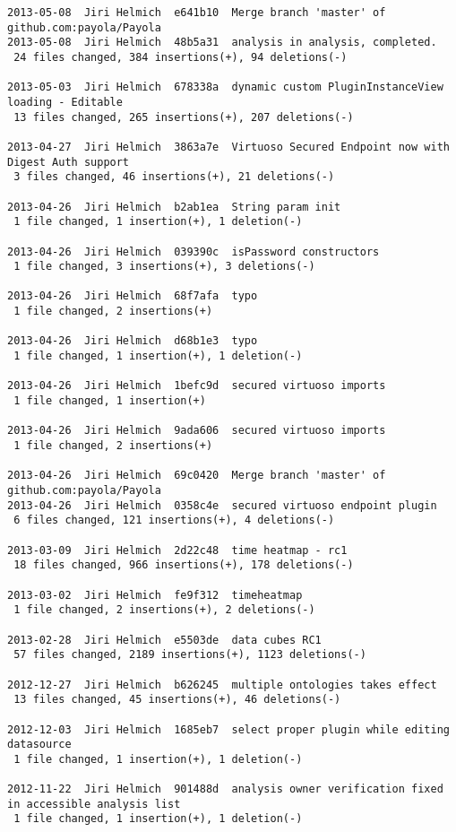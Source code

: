 {\begin{verbatim}
2013-05-08  Jiri Helmich  e641b10  Merge branch 'master' of github.com:payola/Payola
2013-05-08  Jiri Helmich  48b5a31  analysis in analysis, completed.
 24 files changed, 384 insertions(+), 94 deletions(-)

2013-05-03  Jiri Helmich  678338a  dynamic custom PluginInstanceView loading - Editable
 13 files changed, 265 insertions(+), 207 deletions(-)

2013-04-27  Jiri Helmich  3863a7e  Virtuoso Secured Endpoint now with Digest Auth support
 3 files changed, 46 insertions(+), 21 deletions(-)

2013-04-26  Jiri Helmich  b2ab1ea  String param init
 1 file changed, 1 insertion(+), 1 deletion(-)

2013-04-26  Jiri Helmich  039390c  isPassword constructors
 1 file changed, 3 insertions(+), 3 deletions(-)

2013-04-26  Jiri Helmich  68f7afa  typo
 1 file changed, 2 insertions(+)

2013-04-26  Jiri Helmich  d68b1e3  typo
 1 file changed, 1 insertion(+), 1 deletion(-)

2013-04-26  Jiri Helmich  1befc9d  secured virtuoso imports
 1 file changed, 1 insertion(+)

2013-04-26  Jiri Helmich  9ada606  secured virtuoso imports
 1 file changed, 2 insertions(+)

2013-04-26  Jiri Helmich  69c0420  Merge branch 'master' of github.com:payola/Payola
2013-04-26  Jiri Helmich  0358c4e  secured virtuoso endpoint plugin
 6 files changed, 121 insertions(+), 4 deletions(-)

2013-03-09  Jiri Helmich  2d22c48  time heatmap - rc1
 18 files changed, 966 insertions(+), 178 deletions(-)

2013-03-02  Jiri Helmich  fe9f312  timeheatmap
 1 file changed, 2 insertions(+), 2 deletions(-)

2013-02-28  Jiri Helmich  e5503de  data cubes RC1
 57 files changed, 2189 insertions(+), 1123 deletions(-)

2012-12-27  Jiri Helmich  b626245  multiple ontologies takes effect
 13 files changed, 45 insertions(+), 46 deletions(-)

2012-12-03  Jiri Helmich  1685eb7  select proper plugin while editing datasource
 1 file changed, 1 insertion(+), 1 deletion(-)

2012-11-22  Jiri Helmich  901488d  analysis owner verification fixed in accessible analysis list
 1 file changed, 1 insertion(+), 1 deletion(-)


\end{verbatim}}
